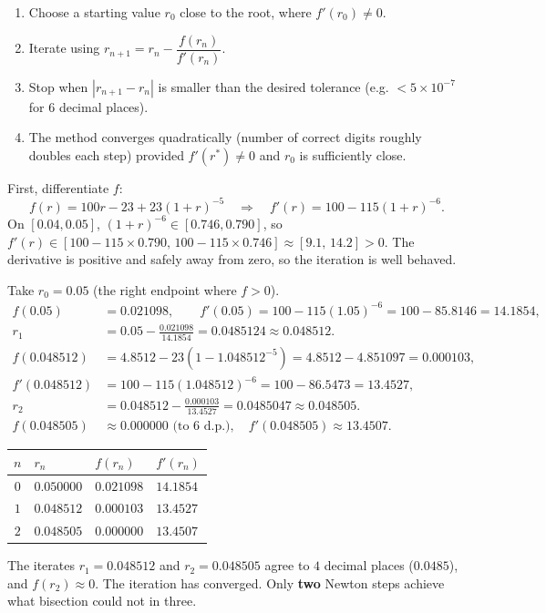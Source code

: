 \documentclass[11pt]{article}
\begin{document}
\begin{methode}
\begin{enumerate}
\item Choose a starting value $r_0$ close to the root, where $f'(r_0)\neq0$.
\item Iterate using $r_{n+1}=r_n-\dfrac{f(r_n)}{f'(r_n)}$.
\item Stop when $|r_{n+1}-r_n|$ is smaller than the desired tolerance (e.g. $<5\times10^{-7}$ for $6$ decimal places).
\item The method converges quadratically (number of correct digits roughly doubles each step) provided $f'(r^{*})\neq0$ and $r_0$ is sufficiently close.
\end{enumerate}
\end{methode}

\begin{exoresolu}
First, differentiate $f$:
\[ f(r)=100r-23+23(1+r)^{-5} \quad\Rightarrow\quad f'(r)=100-115(1+r)^{-6}. \]
On $[0.04,0.05]$, $(1+r)^{-6}\in[0.746,0.790]$, so $f'(r)\in[100-115\times0.790,\,100-115\times0.746]\approx[9.1,\,14.2]>0$. The derivative is positive and safely away from zero, so the iteration is well behaved.

Take $r_0=0.05$ (the right endpoint where $f>0$).
\begin{align*}
f(0.05) &= 0.021098, \qquad f'(0.05) = 100-115(1.05)^{-6}=100-85.8146=14.1854,\\
r_1 &= 0.05 - \frac{0.021098}{14.1854} = 0.0485124 \approx 0.048512.\\[4pt]
f(0.048512) &= 4.8512 - 23\left(1-1.048512^{-5}\right) = 4.8512 - 4.851097 = 0.000103,\\
f'(0.048512) &= 100 - 115(1.048512)^{-6} = 100 - 86.5473 = 13.4527,\\
r_2 &= 0.048512 - \frac{0.000103}{13.4527} = 0.0485047 \approx 0.048505.\\[4pt]
f(0.048505) &\approx 0.000000 \text{ (to 6 d.p.)}, \quad f'(0.048505) \approx 13.4507.
\end{align*}

\begin{center}
\begin{tabular}{|c|l|l|l|}
\hline
\rowcolor{popblueL} $n$ & $r_n$ & $f(r_n)$ & $f'(r_n)$ \\
\hline
$0$ & $0.050000$ & $0.021098$ & $14.1854$ \\
\hline
$1$ & $0.048512$ & $0.000103$ & $13.4527$ \\
\hline
$2$ & $0.048505$ & $0.000000$ & $13.4507$ \\
\hline
\end{tabular}
\end{center}

The iterates $r_1=0.048512$ and $r_2=0.048505$ agree to $4$ decimal places ($0.0485$), and $f(r_2)\approx0$. The iteration has converged. Only \textbf{two} Newton steps achieve what bisection could not in three.
\end{exoresolu}
\end{document}
